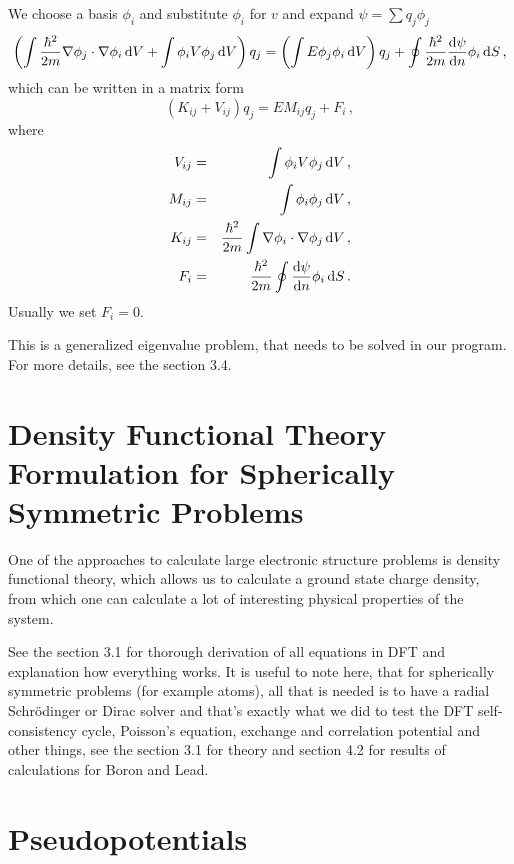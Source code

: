 We choose a basis $\phi_i$ and substitute $\phi_i$ for $v$ and expand $\psi=\sum q_j\phi_j$
\begin{equation}
  \left(\int{\hbar^2\over2m}\nabla\phi_j\cdot\nabla\phi_i\,{\rm d} V+ \int\phi_iV\phi_j\,{\rm d} V\right)q_j = \left(\int E\phi_j\phi_i\,{\rm d} V\right)q_j +\oint{\hbar^2\over2m}{{\rm d}\psi\over{\rm d}n}\phi_i\,{\rm d} S\,,  \label{fem}
\end{equation}
which can be written in a matrix form 
\begin{equation*}
  \left(K_{ij}+V_{ij}\right)q_j=EM_{ij}q_j+F_i\,,
\end{equation*}
where 
\begin{eqnarray*}
V_{ij}&=&\int\phi_iV\phi_j\,{\rm d} V\,, \\
M_{ij}&=&\int\phi_i\phi_j\,{\rm d} V\,, \\
K_{ij}&=&{\hbar^2\over2m}\int\nabla\phi_i\cdot\nabla\phi_j\,{\rm d} V\,, \\
F_i&=&{\hbar^2\over2m}\oint{{\rm d}\psi\over{\rm d}n}\phi_i\,{\rm d} S\,. \\
\end{eqnarray*}
 Usually we set $F_i=0$.

This is a generalized eigenvalue problem, that needs to be solved in our
program. For more details, see the section 3.4.

\section{Density Functional Theory Formulation for Spherically Symmetric
Problems}

One of the approaches to calculate large electronic structure problems is
density functional theory, which allows us to calculate a ground state charge
density, from which one can calculate a lot of interesting physical properties
of the system.

See the section 3.1 for thorough derivation of all equations in DFT and
explanation how everything works. It is useful to note here, that for
spherically symmetric problems (for example atoms), all that is needed is
to have a radial Schr\"odinger or Dirac solver and that's exactly what we did
to test the DFT self-consistency cycle, Poisson's equation, exchange and
correlation potential and other things, see the section 3.1 for theory and
section 4.2 for results of calculations for Boron and Lead.

\section{Pseudopotentials}

